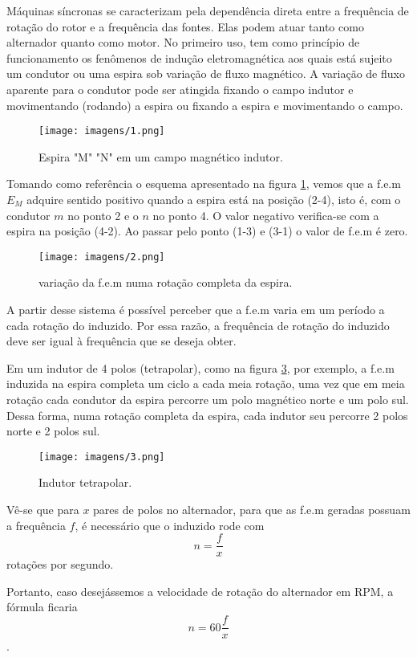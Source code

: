 Máquinas síncronas se caracterizam pela dependência direta entre a frequência de rotação do rotor e a frequência das fontes. Elas podem atuar tanto como alternador quanto como motor. No primeiro uso, tem como princípio de funcionamento os fenômenos de indução eletromagnética aos quais está sujeito um condutor ou uma espira sob variação de fluxo magnético. A variação de fluxo aparente para o condutor pode ser atingida fixando o campo indutor e movimentando (rodando) a espira ou fixando a espira e movimentando o campo.

\begin{figure}[ht!]
\center 
\texttt{[image: imagens/1.png]}
\caption{Espira "M" "N" em um campo magnético indutor.}\label{fig:1}
\end{figure}

Tomando como referência o esquema apresentado na figura \ref{fig:1}, vemos que a f.e.m $E_{M}$ adquire sentido positivo quando a espira está na posição (2-4), isto é, com o condutor $m$ no ponto 2 e o $n$ no ponto 4. O valor negativo verifica-se com a espira na posição (4-2). Ao passar pelo ponto (1-3) e (3-1) o valor de f.e.m é zero. 

\begin{figure}[ht!]
\center 
\texttt{[image: imagens/2.png]}
\caption{variação da f.e.m numa rotação completa da espira.}\label{fig:2}
\end{figure}

A partir desse sistema é possível perceber que a f.e.m varia em um período a cada rotação do induzido. Por essa razão, a frequência de rotação do induzido deve ser igual à frequência que se deseja obter.

Em um indutor de 4 polos (tetrapolar), como na figura \ref{fig:3}, por exemplo, a f.e.m induzida na espira completa um ciclo a cada meia rotação, uma vez que em meia rotação cada condutor da espira percorre um polo magnético norte e um polo sul. Dessa forma, numa rotação completa da espira, cada indutor seu percorre 2 polos norte e 2 polos sul.

\begin{figure}[ht!]
\center 
\texttt{[image: imagens/3.png]}
\caption{Indutor tetrapolar.}\label{fig:3}
\end{figure}

Vê-se que para $x$ pares de polos no alternador, para que as f.e.m geradas possuam a frequência $f$, é necessário que o induzido rode com $$n = \frac{f}{x}$$ rotações por segundo.

Portanto, caso desejássemos a velocidade de rotação do alternador em RPM, a fórmula ficaria $$n = {60}\frac{f}{x}$$.

